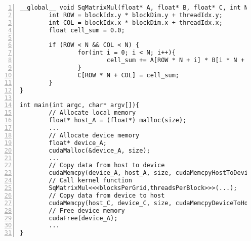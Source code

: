 \begin{lstlisting}[style=cpp,caption={Kernel Function of Matrix Multiplication},label={lst:CUDA_EX},numbers=left]
__global__ void SqMatrixMul(float* A, float* B, float* C, int N) {
        int ROW = blockIdx.y * blockDim.y + threadIdx.y;
        int COL = blockIdx.x * blockDim.x + threadIdx.x;
        float cell_sum = 0.0;

        if (ROW < N && COL < N) {
                for(int i = 0; i < N; i++){
                        cell_sum += A[ROW * N + i] * B[i * N + COL];
                }
                C[ROW * N + COL] = cell_sum;
        }
}

int main(int argc, char* argv[]){
        // Allocate local memory
        float* host_A = (float*) malloc(size);
        ...
        // Allocate device memory
        float* device_A;
        cudaMalloc(&device_A, size);
        ...
        // Copy data from host to device
        cudaMemcpy(device_A, host_A, size, cudaMemcpyHostToDevice);
        // Call kernel function
        SqMatrixMul<<<blocksPerGrid,threadsPerBlock>>>(...);      
        // Copy data from device to host
        cudaMemcpy(host_C, device_C, size, cudaMemcpyDeviceToHost);
        // Free device memory
        cudaFree(device_A);
        ...
}
\end{lstlisting}
